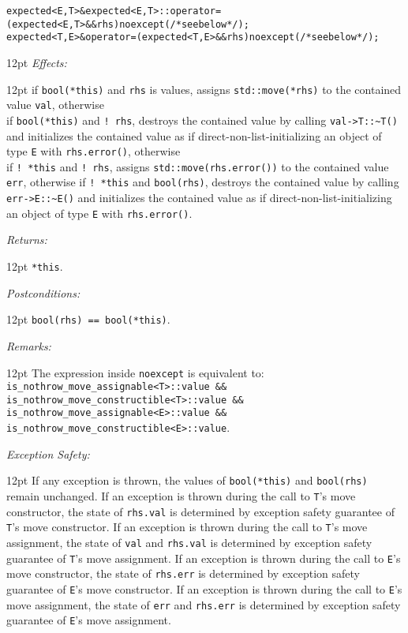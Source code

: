 \documentclass[a4paper,10pt]{article}
\newcommand{\cpp}[1]{\lstinline{#1}}
\newcommand{\wordingItem}[1]{\noindent\textit{#1:}}
\newenvironment{wordingTextItem}[1]{\wordingItem{#1}\vspace{2pt}\noindent\begin{adjustwidth}{12pt}{}}{\vspace{2pt}\end{adjustwidth}}
\newenvironment{wordingPara}{\begin{adjustwidth}{12pt}{}}{\end{adjustwidth}}
\newcommand{\suppress}[1]{\colorbox{suppress_color}{#1}}
\newcommand{\update}[1]{\colorbox{update_color}{#1}}
\begin{document}
\begin{alltt}
\suppress{expected<E,T>& expected<E,T>::operator=(expected<E,T>&& rhs) noexcept(/*see below*/); }
\update{expected<T,E>& operator=(expected<T,E>&& rhs) noexcept(/*see below*/); }
\end{alltt}
\begin{wordingPara}
\begin{wordingTextItem}{Effects}
if \cpp{bool(*this)} and \cpp{rhs} is values, assigns \cpp{std::move(*rhs)} to the contained value \cpp{val}, otherwise \\
if \cpp{bool(*this)} and \cpp{! rhs}, destroys the contained value by calling \cpp{val->T::~T()} and  initializes the contained value as if direct-non-list-initializing an object of type \cpp{E} with \cpp{rhs.error()}, otherwise \\
if \cpp{! *this} and \cpp{! rhs}, assigns \cpp{std::move(rhs.error())} to the contained value \cpp{err}, otherwise  
if \cpp{! *this} and \cpp{bool(rhs)}, destroys the contained value by calling \cpp{err->E::~E()} and  initializes the contained value as if direct-non-list-initializing an object of type \cpp{E} with \cpp{rhs.error()}.
\end{wordingTextItem}
\begin{wordingTextItem}{Returns}
\cpp{*this}.
\end{wordingTextItem}
\begin{wordingTextItem}{Postconditions}
\cpp{bool(rhs) == bool(*this)}.
\end{wordingTextItem}
\begin{wordingTextItem}{Remarks}
The expression inside \cpp{noexcept} is equivalent to:\\
\cpp{is_nothrow_move_assignable<T>::value &&}\\
\cpp{is_nothrow_move_constructible<T>::value &&}\\
\cpp{is_nothrow_move_assignable<E>::value &&}\\
\cpp{is_nothrow_move_constructible<E>::value}.
\end{wordingTextItem}
\begin{wordingTextItem}{Exception Safety}
If any exception is thrown, the values of  \cpp{bool(*this)} and \cpp{bool(rhs)} remain unchanged. If an exception is thrown during the call to \cpp{T}'s move constructor, the state of \cpp{rhs.val} is determined by exception safety guarantee of \cpp{T}'s move constructor. If an exception is thrown during the call to \cpp{T}'s move assignment, the state of \cpp{val} and \cpp{rhs.val} is determined by exception safety guarantee of \cpp{T}'s move assignment. If an exception is thrown during the call to \cpp{E}'s move constructor, the state of \cpp{rhs.err} is determined by exception safety guarantee of \cpp{E}'s move constructor. If an exception is thrown during the call to \cpp{E}'s move assignment, the state of \cpp{err} and \cpp{rhs.err} is determined by exception safety guarantee of \cpp{E}'s move assignment.

\end{wordingTextItem}
\end{wordingPara}
\end{document}
